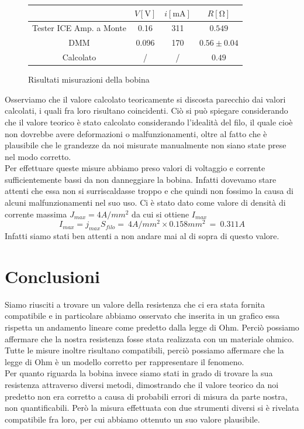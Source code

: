 \documentclass{article}
\begin{document}
\begin{center}
\begin{figure}[h]
\centering
\begin{tabular}{c|c|c|c}
	& $V [\si{\volt}]$ & $i [\si{\milli\ampere}]$ & $R [\si{\ohm}]$\\
	\hline
	Tester ICE Amp. a Monte & 0.16 & 311 & $0.549$ \\
	DMM & 0.096 & 170 & $0.56 \pm 0.04$\\
	Calcolato & / & / & $0.49$
	
\end{tabular}
\caption{Risultati misurazioni della bobina}
\end{figure}
\end{center}
Osserviamo che il valore calcolato teoricamente si discosta parecchio dai valori calcolati, i quali fra loro risultano coincidenti. Ciò si può spiegare considerando che il valore teorico è stato calcolato considerando l'idealità del filo, il quale cioè non dovrebbe avere deformazioni o malfunzionamenti, oltre al fatto che è plausibile che le grandezze da noi misurate manualmente non siano state prese nel modo corretto. \\
Per effettuare queste misure abbiamo preso valori di voltaggio e corrente sufficientemente bassi da non danneggiare la bobina. Infatti dovevamo stare attenti che essa non si surriscaldasse troppo e che quindi non fossimo la causa di alcuni malfunzionamenti nel suo uso. Ci è stato dato come valore di densità di corrente massima $J_{max} = 4A/mm^2$ da cui si ottiene $I_{max}$
\begin{equation}
    I_{max} = j_{max} S_{filo} = \ 4A/mm^2 \times 0.158mm^2 \ = \ 0.311 A
\end{equation}
Infatti siamo stati ben attenti a non andare mai al di sopra di questo valore.

\newpage

\section{Conclusioni}
Siamo riusciti a trovare un valore della resistenza che ci era stata fornita compatibile e in particolare abbiamo osservato che inserita in un grafico essa rispetta un andamento lineare come predetto dalla legge di Ohm. Perciò possiamo affermare che la nostra resistenza fosse stata realizzata con un materiale ohmico. Tutte le misure inoltre risultano compatibili, perciò possiamo affermare che la legge di Ohm è un modello corretto per rappresentare il fenomeno.\\
Per quanto riguarda la bobina invece siamo stati in grado di trovare la sua resistenza attraverso diversi metodi, dimostrando che il valore teorico da noi predetto non era corretto a causa di probabili errori di misura da parte nostra, non quantificabili. Però la misura effettuata con due strumenti diversi si è rivelata compatibile fra loro, per cui abbiamo ottenuto un suo valore plausibile.
\end{document}
